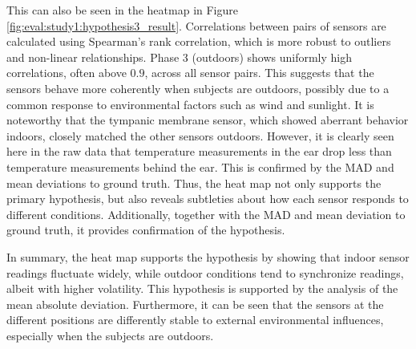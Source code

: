 This can also be seen in the heatmap in Figure \ref{fig:eval:study1:hypothesis3_result}.  
Correlations between pairs of sensors are calculated using Spearman's rank correlation, which is more robust to outliers and non-linear relationships.  
Phase 3 (outdoors) shows uniformly high correlations, often above \(0.9\), across all sensor pairs.  
This suggests that the sensors behave more coherently when subjects are outdoors, possibly due to a common response to environmental factors such as wind and sunlight.  
It is noteworthy that the tympanic membrane sensor, which showed aberrant behavior indoors, closely matched the other sensors outdoors.
However, it is clearly seen here in the raw data that temperature measurements in the ear drop less than temperature measurements behind the ear. 
This is confirmed by the MAD and mean deviations to ground truth. 
Thus, the heat map not only supports the primary hypothesis, but also reveals subtleties about how each sensor responds to different conditions.
Additionally, together with the MAD and mean deviation to ground truth, it provides confirmation of the hypothesis.

In summary, the heat map supports the hypothesis by showing that indoor sensor readings fluctuate widely, while outdoor conditions tend to synchronize readings, albeit with higher volatility.
This hypothesis is supported by the analysis of the mean absolute deviation. 
Furthermore, it can be seen that the sensors at the different positions are differently stable to external environmental influences, especially when the subjects are outdoors.

